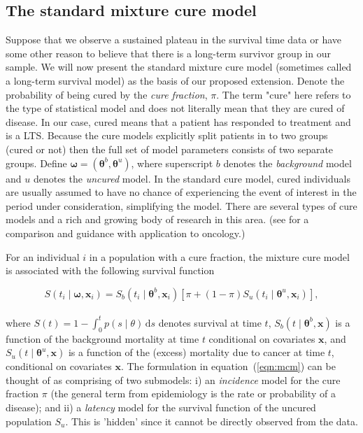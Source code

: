 \documentclass[AMA,STIX1COL]{WileyNJD-v2}
\begin{document}
\subsection{The standard mixture cure model} \label{sec:basic_model}
Suppose that we observe a sustained plateau in the survival time data or have some other reason to believe that there is a long-term survivor group in our sample. We will now present the standard mixture cure model (sometimes called a long-term survival model) as the basis of our proposed extension.
Denote the probability of being cured by the {\it cure fraction}, $\pi$.
The term "cure" here refers to the type of statistical model and does not literally mean that they are cured of disease. In our case, cured means that a patient has responded to treatment and is a LTS.
Because the cure models explicitly split patients in to two groups (cured or not) then the full set of model parameters consists of two separate groups.
Define $\bm\omega = (\bm\theta^b, \bm\theta^u)$, where superscript $b$ denotes the \textit{background} model and $u$ denotes the \textit{uncured} model.
In the standard cure model, cured individuals are usually assumed to have no chance of experiencing the event of interest in the period under consideration, simplifying the model.
There are several types of cure models and a rich and growing body of research in this area.
(see \citep{Yu2013} for a comparison and guidance with application to oncology.)

For an individual $i$ in a population with a cure fraction, the mixture cure model is associated with the following survival function

\begin{equation}
\label{eqn:mcm}
S(t_{i} \mid \bm\omega, \bm{x}_i) = S_b(t_{i} \mid \bm\theta^b, \bm{x}_{i}) \left[\pi + (1 - \pi) S_u(t_{i} \mid \bm\theta^u, \bm{x}_{i}) \right],
\end{equation}
\\
\noindent
where $S(t) = 1 \!-\! \int_0^t p(s \mid \theta)\, \text{d}s$ denotes survival at time $t$,
$S_b(t \mid \bm\theta^b, \bm{x})$ is a function of the background mortality at time $t$ conditional on covariates $\bm{x}$,
and $S_u(t \mid \bm\theta^u, \bm{x})$ is a function of the (excess) mortality due to cancer at time $t$, conditional on covariates $\bm{x}$.
The formulation in equation~(\ref{eqn:mcm}) can be thought of as comprising of two submodels: i) an \textit{incidence} model for the cure fraction $\pi$ (the general term from epidemiology is the rate or probability of a disease); and ii) a \textit{latency} model for the survival function of the uncured population $S_u$. This is 'hidden' since it cannot be directly observed from the data.
\end{document}
